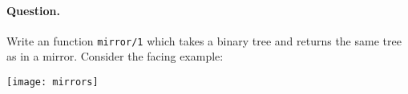 \paragraph{Question.} 
\begin{multicols}{2}
Write an \Erlang function \texttt{mirror/1} which takes a binary tree
and returns the same tree as in a mirror. Consider the facing example:
\par\vfill\columnbreak
\begin{center}
\texttt{[image: mirrors]}
\end{center}
\end{multicols}

